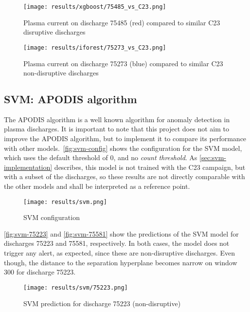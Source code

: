 \begin{figure}[H]
    \centering
    \texttt{[image: results/xgboost/75485\_vs\_C23.png]}
    \caption{Plasma current on discharge 75485 (red) compared to similar C23 disruptive discharges}
    \label{fig:ip_75485}
\end{figure}

\begin{figure}[H]
    \centering
    \texttt{[image: results/iforest/75273\_vs\_C23.png]}
    \caption{Plasma current on discharge 75273 (blue) compared to similar C23 non-disruptive discharges}
    \label{fig:iforest-75273-c23}
\end{figure}

\subsection{\acs{SVM}: \acs{APODIS} algorithm}

The \ac{APODIS} algorithm is a well known algorithm for anomaly detection in plasma discharges. It is important to note that this project does not aim to improve the \ac{APODIS} algorithm, but to implement it to compare its performance with other models.\ \autoref{fig:svm-config} shows the configuration for the \ac{SVM} model, which uses the default threshold of 0, and no \textit{count threshold}. As \autoref{sec:svm-implementation} describes, this model is not trained with the C23 campaign, but with a subset of the discharges, so these results are not directly comparable with the other models and shall be interpreted as a reference point.

\begin{figure}[H]
    \centering
    \texttt{[image: results/svm.png]}
    \caption{SVM configuration}
    \label{fig:svm-config}
\end{figure}

\autoref{fig:svm-75223} and \autoref{fig:svm-75581} show the predictions of the \ac{SVM} model for discharges 75223 and 75581, respectively. In both cases, the model does not trigger any alert, as expected, since these are non-disruptive discharges. Even though, the distance to the separation hyperplane becomes narrow on window 300 for discharge 75223. 

\begin{figure}[H]
    \centering
    \texttt{[image: results/svm/75223.png]}
    \caption{SVM prediction for discharge 75223 (non-disruptive)}
    \label{fig:svm-75223}
\end{figure}

